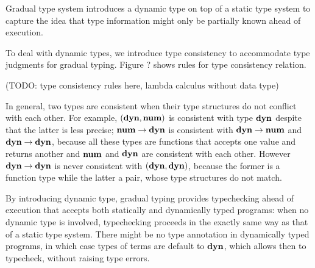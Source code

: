 Gradual type system introduces a dynamic type on top of a static type system
to capture the idea that type information might only be partially known
ahead of execution.

To deal with dynamic types, we introduce type consistency
to accommodate type judgments for gradual typing.
Figure ? shows rules for type consistency relation.

(TODO: type consistency rules here, lambda calculus without data type)

In general, two types are consistent when
their type structures do not conflict with each other.
For example, $(\textbf{dyn}, \textbf{num})$ is consistent with type $\textbf{dyn}$
despite that the latter is less precise;
$\textbf{num} \rightarrow \textbf{dyn}$ is consistent with $\textbf{dyn} \rightarrow \textbf{num}$ and $\textbf{dyn} \rightarrow \textbf{dyn}$,
because all these types are functions that accepts one value and returns another and
$\textbf{num}$ and $\textbf{dyn}$ are consistent with each other.
However $\textbf{dyn} \rightarrow \textbf{dyn}$ is never consistent with $(\textbf{dyn}, \textbf{dyn})$,
because the former is a function type while the latter a pair,
whose type structures do not match.

By introducing dynamic type, gradual typing provides
typechecking ahead of execution that accepts both statically and dynamically typed programs: 
when no dynamic type is involved, typechecking proceeds in the
exactly same way as that of a static type system.
There might be no type annotation in dynamically typed programs,
in which case types of terms are default to $\textbf{dyn}$, which allows
then to typecheck, without raising type errors.







